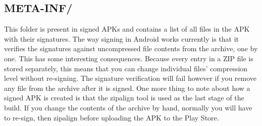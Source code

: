 \subsection{META-INF/}
This folder is present in signed APKs and contains a list of all files in the APK with their signatures. The way signing in Android works currently is that it verifies the signatures against uncompressed file contents from the archive, one by one.
This has some interesting consequences. Because every entry in a ZIP file is stored separately, this means that you can change individual files’ compression level without re-signing. The signature verification will fail however if you remove any file from the archive after it is signed.
One more thing to note about how a signed APK is created is that the zipalign tool is used as the last stage of the build. If you change the contents of the archive by hand, normally you will have to re-sign, then zipalign before uploading the APK to the Play Store.



